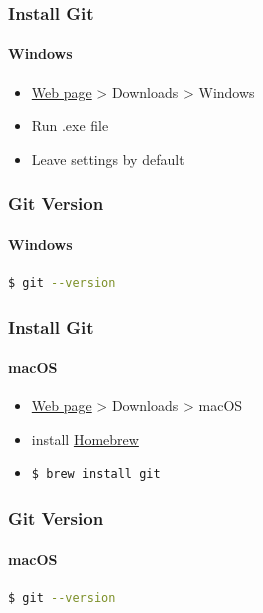 \documentclass{beamer}
\begin{document}
	\begin{frame}
		\frametitle{Install Git}
		\framesubtitle{Windows}
		\begin{itemize}
			\item \textcolor{light-primary}{\href{https://git-scm.com}{Web page}}
			> Downloads > Windows
			\item Run .exe file
			\item Leave settings by default
		\end{itemize}
	\end{frame}

	\begin{frame}[fragile]
		\frametitle{Git Version}
		\framesubtitle{Windows}
\begin{lstlisting}[language=bash]
$ git --version
\end{lstlisting}
	\end{frame}
		
	\begin{frame}[fragile]
		\frametitle{Install Git}
		\framesubtitle{macOS}
		
		\begin{itemize}
			\item \textcolor{light-primary}{\href{https://git-scm.com}{Web page}}
			> Downloads > macOS
			\item install \textcolor{light-primary}{\href{https://brew.sh}{Homebrew}}
			\item
\begin{lstlisting}[language=bash]
$ brew install git
\end{lstlisting}
		\end{itemize}
	\end{frame}
	
	\begin{frame}[fragile]
		\frametitle{Git Version}
		\framesubtitle{macOS}
\begin{lstlisting}[language=bash]
$ git --version
\end{lstlisting}
	\end{frame}
	
	
\end{document}
